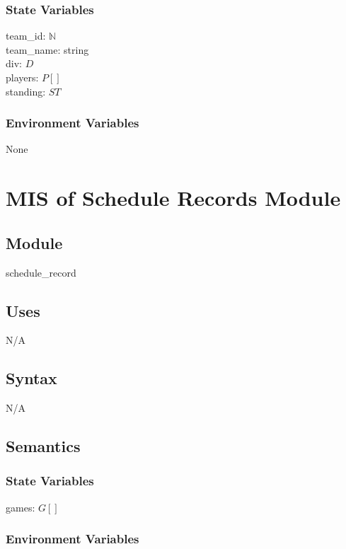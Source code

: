 \documentclass[12pt, titlepage]{article}
\begin{document}
\subsubsection{State Variables}

team\_id: $\mathbb{N}$\\
team\_name: string\\
div: $D$\\
players: $P[]$\\
standing: $ST$

\subsubsection{Environment Variables}

None

\newpage

\section{MIS of Schedule Records Module} \label{mSS}

\subsection{Module}

schedule\_record

\subsection{Uses}

N/A

\subsection{Syntax}

N/A

\subsection{Semantics}

\subsubsection{State Variables}

games: $G[]$

\subsubsection{Environment Variables}
\end{document}

